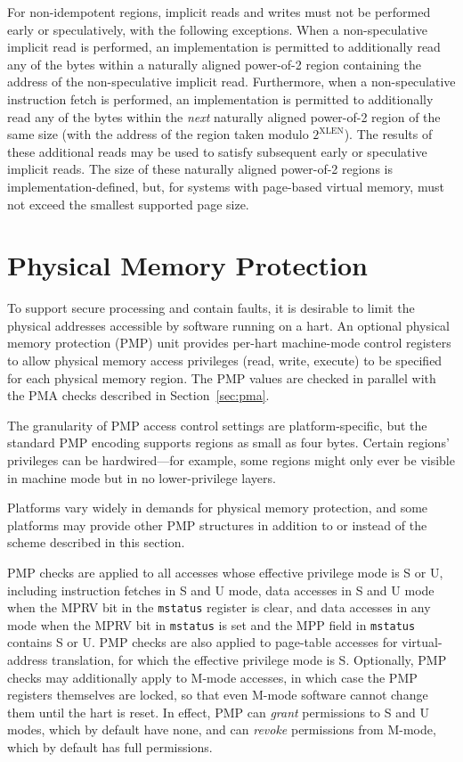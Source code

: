 For non-idempotent regions, implicit reads and writes must not be performed
early or speculatively, with the following exceptions.
When a non-speculative implicit read is performed, an implementation is
permitted to additionally read any of the bytes within a naturally aligned
power-of-2 region containing the address of the non-speculative implicit read.
Furthermore, when a non-speculative instruction fetch is performed, an
implementation is permitted to additionally read any of the bytes within the
{\em next} naturally aligned power-of-2 region of the same size (with the
address of the region taken modulo $2^{\text{XLEN}}$).
The results of these additional reads may be used to satisfy subsequent early
or speculative implicit reads.
The size of these naturally aligned power-of-2 regions is
implementation-defined, but, for systems with page-based virtual memory, must
not exceed the smallest supported page size.

\section{Physical Memory Protection}
\label{sec:pmp}

To support secure processing and contain faults, it is desirable to
limit the physical addresses accessible by software running on a hart.
An optional physical memory protection (PMP) unit provides
per-hart machine-mode control registers to allow
physical memory access privileges (read, write, execute) to be
specified for each physical memory region.  The PMP values are checked
in parallel with the PMA checks described in Section~\ref{sec:pma}.

The granularity of PMP access control settings are platform-specific,
but the standard PMP
encoding supports regions as small as four bytes.  Certain regions' privileges
can be hardwired---for example, some regions might only ever be visible in
machine mode but in no lower-privilege layers.

\begin{commentary}
Platforms vary widely in demands for physical memory protection, and
some platforms may provide other PMP structures in addition to or
instead of the scheme described in this section.
\end{commentary}

PMP checks are applied to all accesses whose effective privilege mode is S or
U, including instruction fetches in S and U mode, data accesses in S and
U mode when the MPRV bit in the {\tt mstatus} register is clear, and data
accesses in any mode when the MPRV bit in {\tt mstatus} is set and the MPP
field in {\tt mstatus} contains S or U.
PMP checks are also applied to page-table
accesses for virtual-address translation, for which the effective
privilege mode is S.  Optionally, PMP checks may additionally apply
to M-mode accesses, in which case the PMP registers themselves are
locked, so that even M-mode software cannot change them until the hart is
reset.  In effect, PMP can {\em grant} permissions to S and U
modes, which by default have none, and can {\em revoke} permissions
from M-mode, which by default has full permissions.

